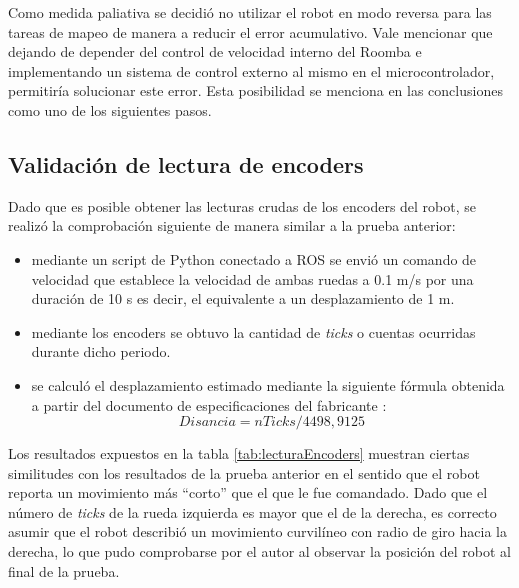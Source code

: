 Como medida paliativa se decidió no utilizar el robot en modo reversa para las tareas de mapeo de manera a reducir el error acumulativo. Vale mencionar que dejando de depender del control de velocidad interno del Roomba e implementando un sistema de control externo al mismo en el microcontrolador, permitiría solucionar este error. Esta posibilidad se menciona en las conclusiones como uno de los siguientes pasos.

\subsection{Validación de lectura de encoders}

Dado que es posible obtener las lecturas crudas de los encoders del robot, se realizó la comprobación siguiente de manera similar a la prueba anterior:

\begin{itemize}
    \item mediante un script de Python conectado a ROS se envió un comando de velocidad que establece la velocidad de ambas ruedas a 0.1 m/s por una duración de 10 s es decir, el equivalente a un desplazamiento de 1 m.
    \item mediante los encoders se obtuvo la cantidad de \textit{ticks} o cuentas ocurridas durante dicho periodo.
    \item se calculó el desplazamiento estimado mediante la siguiente fórmula obtenida a partir del documento de especificaciones del fabricante \citep{PAPER:5}:
          \begin{equation}
              Disancia = nTicks / 4498,9125
          \end{equation}

\end{itemize}

Los resultados expuestos en la tabla \ref{tab:lecturaEncoders} muestran ciertas similitudes con los resultados de la prueba anterior en el sentido que el robot reporta un movimiento más ``corto'' que el que le fue comandado. Dado que el número de \textit{ticks} de la rueda izquierda es mayor que el de la derecha, es correcto asumir que el robot describió un movimiento curvilíneo con radio de giro hacia la derecha, lo que pudo comprobarse por el autor al observar la posición del robot al final de la prueba.

